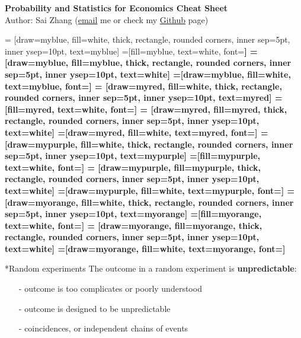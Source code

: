 \documentclass[10pt,landscape,a4paper]{article}
\makeatletter
\renewcommand{\section}{\@startsection{section}{1}{0mm}{1ex}{.2ex}{\normalsize\bfseries}}
\makeatother
\begin{document}
\begin{center}{\large{\textbf{Probability and Statistics for Economics Cheat Sheet}}}\\
Author: Sai Zhang (\href{mailto:saizhang.econ@gmail.com}{email} me or check my \href{https://github.com/SaiChrisZHANG}{Github} page)
\end{center}

\small
\begin{multicols*}{5}

 = [draw=myblue, fill=white, thick, rectangle, rounded corners, inner sep=5pt, inner ysep=10pt, text=myblue]
 =[fill=myblue, text=white, font=\bfseries]
 = [draw=myblue, fill=myblue, thick, rectangle, rounded corners, inner sep=5pt, inner ysep=10pt, text=white]
 =[draw=myblue, fill=white, text=myblue, font=\bfseries]
 = [draw=myred, fill=white, thick, rectangle, rounded corners, inner sep=5pt, inner ysep=10pt, text=myred]
 =[fill=myred, text=white, font=\bfseries]
 = [draw=myred, fill=myred, thick, rectangle, rounded corners, inner sep=5pt, inner ysep=10pt, text=white]
 =[draw=myred, fill=white, text=myred, font=\bfseries]
 = [draw=mypurple, fill=white, thick, rectangle, rounded corners, inner sep=5pt, inner ysep=10pt, text=mypurple]
 =[fill=mypurple, text=white, font=\bfseries]
 = [draw=mypurple, fill=mypurple, thick, rectangle, rounded corners, inner sep=5pt, inner ysep=10pt, text=white]
 =[draw=mypurple, fill=white, text=mypurple, font=\bfseries]
 = [draw=myorange, fill=white, thick, rectangle, rounded corners, inner sep=5pt, inner ysep=10pt, text=myorange]
 =[fill=myorange, text=white, font=\bfseries]
 = [draw=myorange, fill=myorange, thick, rectangle, rounded corners, inner sep=5pt, inner ysep=10pt, text=white]
 =[draw=myorange, fill=white, text=myorange, font=\bfseries]

\section*{Random experiments}
The outcome in a random experiment is \textbf{unpredictable}:
\begin{itemize}
    \item[-] outcome is too complicates or poorly understood
    \item[-] outcome is designed to be unpredictable
    \item[-] coincidences, or independent chains of events
\end{itemize}


\end{multicols*}
\end{document}
